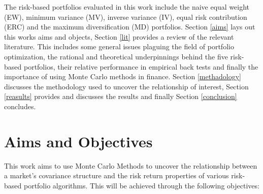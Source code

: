 \documentclass[11pt,preprint, authoryear]{elsarticle}
\numberwithin{equation}{section}
\numberwithin{figure}{section}
\numberwithin{table}{section}
\begin{document}
The risk-based portfolios evaluated in this work include the naive equal
weight (EW), minimum variance (MV), inverse variance (IV), equal risk
contribution (ERC) and the maximum diversification (MD) portfolios.
Section \ref{aims} lays out this works aims and objects, Section
\ref{lit} provides a review of the relevant literature. This includes
some general issues plaguing the field of portfolio optimization, the
rational and theoretical underpinnings behind the five risk-based
portfolios, their relative performance in empirical back tests and
finally the importance of using Monte Carlo methods in finance. Section
\ref{methadology} discusses the methodology used to uncover the
relationship of interest, Section \ref{reasults} provides and discusses
the results and finally Section \ref{conclusion} concludes.

\hypertarget{aims-and-objectives}{%
\section{\texorpdfstring{Aims and Objectives
\label{aims}}{Aims and Objectives }}\label{aims-and-objectives}}

This work aims to use Monte Carlo Methods to uncover the relationship
between a market's covariance structure and the risk return properties
of various risk-based portfolio algorithms. This will be achieved
through the following objectives:
\end{document}
